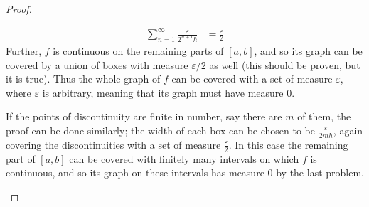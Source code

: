 \documentclass[12pt]{article}
\theoremstyle{definition}
\newenvironment{problem}[2][Problem]{\begin{trivlist}
\item[\hskip \labelsep {\bfseries #1}\hskip \labelsep {\bfseries #2.}]}{\end{trivlist}}
\begin{document}
\begin{problem}{3}
\begin{proof}
\begin{enumerate}[label=(\roman*)]
				\begin{align*}
					\sum_{n=1}^\infty \frac{\varepsilon}{2^{n+1}h} &= \frac{\varepsilon}{2}
				\end{align*}
				Further, $f$ is continuous on the remaining parts of $[a,b]$, and so its graph can be covered by a union of boxes with measure $\varepsilon/2$ as well (this should be proven, but it is true). Thus the whole graph of $f$ can be covered with a set of measure $\varepsilon$, where $\varepsilon$ is arbitrary, meaning that its graph must have measure $0$.
				\par 				If the points of discontinuity are finite in number, say there are $m$ of them, the proof can be done similarly; the width of each box can be chosen to be $\frac{\varepsilon}{2mh}$, again covering the discontinuities with a set of measure $\frac{\varepsilon}{2}$. In this case the remaining part of $[a,b]$ can be covered with finitely many intervals on which $f$ is continuous, and so its graph on these intervals has measure $0$ by the last problem.
		\end{enumerate}
	\end{proof}
\end{problem}
\end{document}
